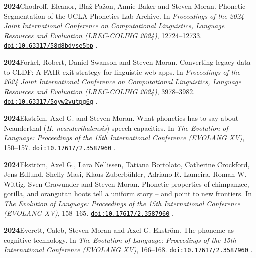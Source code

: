 \documentclass[11pt]{article}
\newcommand{\hangpara}{
 \setlength{\parindent}{0in} %
 \hangindent=0.42in %
}
\newcommand{\doi}[1]{%
  \href{https://doi.org/#1}{\nolinkurl{doi:#1}}%
}
\begin{document}
\vskip 6pt
\hangpara
{\bf 2024}\hspace{1ex}Chodroff, Eleanor, Blaž Pažon, Annie Baker and Steven Moran. Phonetic Segmentation of the UCLA Phonetics Lab Archive. In {\it Proceedings of the 2024 Joint International Conference on Computational Linguistics, Language Resources and Evaluation (LREC-COLING 2024)}, 12724--12733. \doi{10.63317/58d8bdvse5bp}.

\vskip 6pt
\hangpara
{\bf 2024}\hspace{1ex}Forkel, Robert, Daniel Swanson and Steven Moran. Converting legacy data to CLDF: A FAIR exit strategy for linguistic web apps. In {\it Proceedings of the 2024 Joint International Conference on Computational Linguistics, Language Resources and Evaluation (LREC-COLING 2024)}, 3978--3982. \doi{10.63317/5oyw2vutpg6g}.

\vskip 6pt
\hangpara
{\bf 2024}\hspace{1ex}Ekstr{\"o}m, Axel G. and Steven Moran. What phonetics has to say about Neanderthal (\textit{H. neanderthalensis}) speech capacities. In {\it The Evolution of Language: Proceedings of the 15th International Conference (EVOLANG XV)}, 150--157. \doi{10.17617/2.3587960}.

\vskip 6pt
\hangpara
{\bf 2024}\hspace{1ex}Ekstr{\"o}m, Axel G., Lara Nellissen, Tatiana Bortolato, Catherine Crockford, Jens Edlund, Shelly Masi, Klaus Zuberb{\"u}hler, Adriano R. Lameira, Roman W. Wittig, Sven Grawunder and Steven Moran. Phonetic properties of chimpanzee, gorilla, and orangutan hoots tell a uniform story -- and point to new frontiers. In {\it The Evolution of Language: Proceedings of the 15th International Conference (EVOLANG XV)}, 158--165. \doi{10.17617/2.3587960}.

\vskip 6pt
\hangpara
{\bf 2024}\hspace{1ex}Everett, Caleb, Steven Moran and Axel G. Ekstr{\"o}m. The phoneme as cognitive technology. In {\it The Evolution of Language: Proceedings of the 15th International Conference (EVOLANG XV)}, 166--168. \doi{10.17617/2.3587960}.
\end{document}

